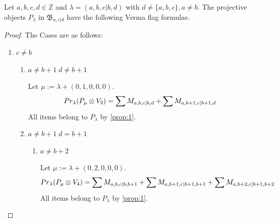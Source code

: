 \begin{theorem}
  Let $a,b,c,d \in \mathbb{Z}$ and $\lambda = (a,b,c|b,d)$ with $d \neq \{a,b,c\}, a \neq b$. The projective objects $P_{\lambda}$ in $\mathfrak{B}_{a,c|d}$ have the following Verma flag formulae.
\end{theorem}
\begin{proof} The Cases are as follows:\par
\begin{enumerate}
  \item $c \neq b$ 
    \begin{enumerate}
      \item $ a\neq b+1\; d\neq b+1 $ \par
        Let $\mu:=\lambda + (0,1,0,0,0) $.
        \begin{equation}\notag
          \begin{aligned}
            Pr_{\lambda}(P_\mu \otimes V_{2}) &=
\sum M_{a,b,c|b,d}
+\sum M_{a,b+1,c|b+1,d}
          \end{aligned}
        \end{equation}
All items belong to $P_\lambda$ by \cref{prop:1}.
    
      \item $a\neq b+1 \; d=b+1 $
        \begin{enumerate}
          \item $ a\neq b+2 $\par
        Let $\mu:=\lambda + (0,2,0,0,0) $.
        \begin{equation}\notag
          \begin{aligned}
            Pr_{\lambda}(P_\mu \otimes V_{4}) &=
\sum M_{a,b,c|b,b+1}
+\sum M_{a,b+1,c|b+1,b+1}
+\sum M_{a,b+2,c|b+1,b+2}
          \end{aligned}
        \end{equation}
All items belong to $P_\lambda$ by \cref{prop:1}.
    

\end{enumerate}
\end{enumerate}
\end{enumerate}
\end{proof}
